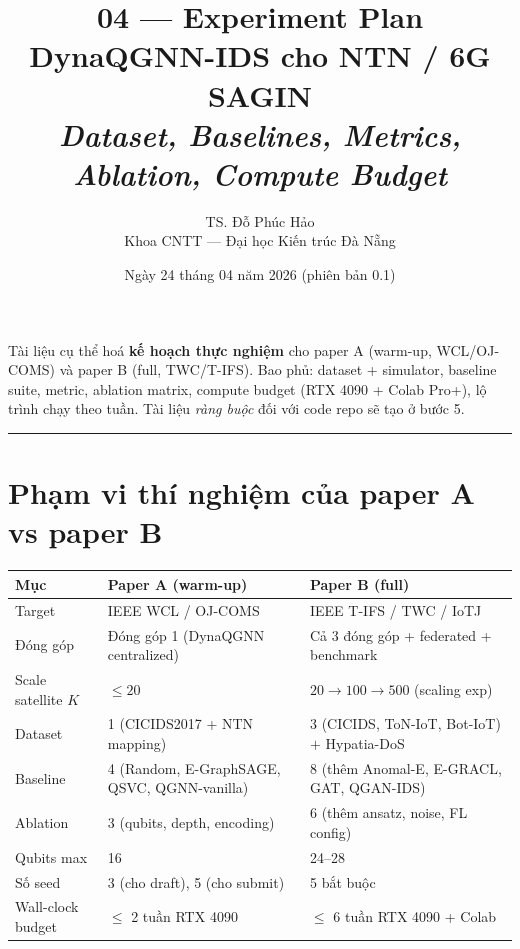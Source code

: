 \documentclass[11pt,a4paper]{article}
\title{\vspace{-1.5cm}\textbf{\color{accent} 04 --- Experiment Plan} \\[3pt]
       \Large DynaQGNN-IDS cho NTN / 6G SAGIN \\[2pt]
       \normalsize \textit{Dataset, Baselines, Metrics, Ablation, Compute Budget}}
\author{TS. Đỗ Phúc Hảo \\ \small Khoa CNTT --- Đại học Kiến trúc Đà Nẵng}
\date{Ngày 24 tháng 04 năm 2026 (phiên bản 0.1)}
\begin{document}
\maketitle
\thispagestyle{fancy}

\begin{note}
Tài liệu cụ thể hoá \textbf{kế hoạch thực nghiệm} cho paper A (warm-up, WCL/OJ-COMS) và paper B (full, TWC/T-IFS). Bao phủ: dataset + simulator, baseline suite, metric, ablation matrix, compute budget (RTX 4090 + Colab Pro+), lộ trình chạy theo tuần. Tài liệu \textit{ràng buộc} đối với code repo sẽ tạo ở bước 5.
\end{note}

\tableofcontents
\vspace{0.4cm}
\hrule
\vspace{0.4cm}

\section{Phạm vi thí nghiệm của paper A vs paper B}

\begin{longtable}{@{}p{3.5cm} p{5.5cm} p{5.5cm}@{}}
\toprule
\textbf{Mục} & \textbf{Paper A (warm-up)} & \textbf{Paper B (full)} \\
\midrule
\endhead
Target & IEEE WCL / OJ-COMS & IEEE T-IFS / TWC / IoTJ \\
Đóng góp & Đóng góp 1 (DynaQGNN centralized) & Cả 3 đóng góp + federated + benchmark \\
Scale satellite $K$ & $\leq 20$ & $20 \rightarrow 100 \rightarrow 500$ (scaling exp) \\
Dataset & 1 (CICIDS2017 + NTN mapping) & 3 (CICIDS, ToN-IoT, Bot-IoT) $+$ Hypatia-DoS \\
Baseline & 4 (Random, E-GraphSAGE, QSVC, QGNN-vanilla) & 8 (thêm Anomal-E, E-GRACL, GAT, QGAN-IDS) \\
Ablation & 3 (qubits, depth, encoding) & 6 (thêm ansatz, noise, FL config) \\
Qubits max & 16 & 24--28 \\
Số seed & 3 (cho draft), 5 (cho submit) & 5 bắt buộc \\
Wall-clock budget & $\leq$ 2 tuần RTX 4090 & $\leq$ 6 tuần RTX 4090 + Colab \\
\bottomrule
\end{longtable}
\end{document}
